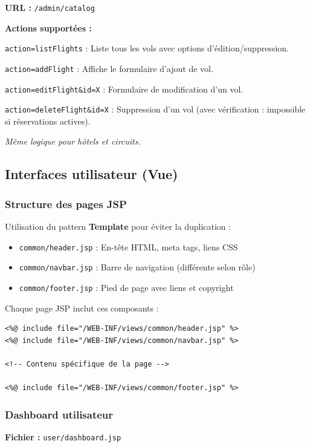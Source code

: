 \documentclass[12pt,a4paper]{report}
\begin{document}
\textbf{URL :} \texttt{/admin/catalog}

\textbf{Actions supportées :}

\texttt{action=listFlights} : Liste tous les vols avec options d'édition/suppression.

\texttt{action=addFlight} : Affiche le formulaire d'ajout de vol.

\texttt{action=editFlight\&id=X} : Formulaire de modification d'un vol.

\texttt{action=deleteFlight\&id=X} : Suppression d'un vol (avec vérification : impossible si réservations actives).

\textit{Même logique pour hôtels et circuits.}

\subsection{Interfaces utilisateur (Vue)}

\subsubsection{Structure des pages JSP}

Utilisation du pattern \textbf{Template} pour éviter la duplication :

\begin{itemize}
    \item \texttt{common/header.jsp} : En-tête HTML, meta tags, liens CSS
    \item \texttt{common/navbar.jsp} : Barre de navigation (différente selon rôle)
    \item \texttt{common/footer.jsp} : Pied de page avec liens et copyright
\end{itemize}

Chaque page JSP inclut ces composants :
\begin{verbatim}
<%@ include file="/WEB-INF/views/common/header.jsp" %>
<%@ include file="/WEB-INF/views/common/navbar.jsp" %>

<!-- Contenu spécifique de la page -->

<%@ include file="/WEB-INF/views/common/footer.jsp" %>
\end{verbatim}

\subsubsection{Dashboard utilisateur}

\textbf{Fichier :} \texttt{user/dashboard.jsp}
\end{document}

